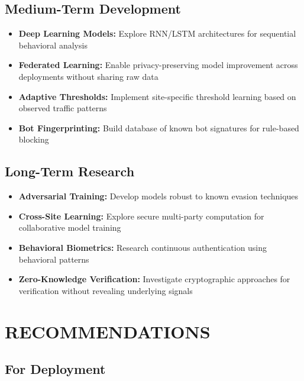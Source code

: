 \subsection{Medium-Term Development}

\begin{itemize}
    \item \textbf{Deep Learning Models:} Explore RNN/LSTM architectures for sequential behavioral analysis
    
    \item \textbf{Federated Learning:} Enable privacy-preserving model improvement across deployments without sharing raw data
    
    \item \textbf{Adaptive Thresholds:} Implement site-specific threshold learning based on observed traffic patterns
    
    \item \textbf{Bot Fingerprinting:} Build database of known bot signatures for rule-based blocking
\end{itemize}

\subsection{Long-Term Research}

\begin{itemize}
    \item \textbf{Adversarial Training:} Develop models robust to known evasion techniques
    
    \item \textbf{Cross-Site Learning:} Explore secure multi-party computation for collaborative model training
    
    \item \textbf{Behavioral Biometrics:} Research continuous authentication using behavioral patterns
    
    \item \textbf{Zero-Knowledge Verification:} Investigate cryptographic approaches for verification without revealing underlying signals
\end{itemize}

\section{RECOMMENDATIONS}

\subsection{For Deployment}


